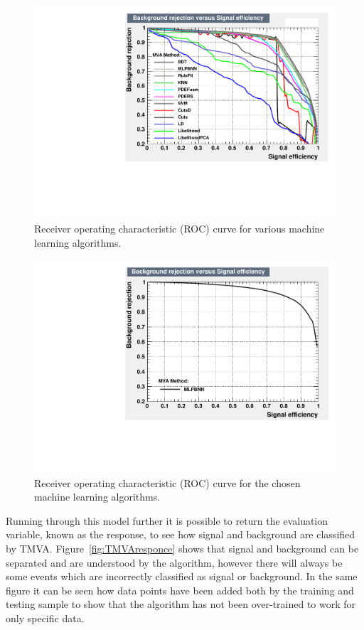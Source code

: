 \begin{figure}[h!]
\centering

\includegraphics[width=\textwidth]{figures/TMVA/roc12.pdf}
\caption{Receiver operating characteristic (ROC) curve for various machine learning algorithms.}
\label{fig:TMVAroc}
\end{figure}

\begin{figure}[h!]
\centering

\includegraphics[width=\textwidth]{figures/TMVA/ROC1.pdf}
\caption{Receiver operating characteristic (ROC) curve for the chosen machine learning algorithms.}
\label{fig:TMVAroc2}
\end{figure}

Running through this model further it is possible to return the evaluation variable, known as the response, to see how signal and background are classified by TMVA. Figure~\ref{fig:TMVAresponce} shows that signal and background can be separated and are understood by the algorithm, however there will always be some events which are incorrectly classified as signal or background. In the same figure it can be seen how data points have been added both by the training and testing sample to show that the algorithm has not been over-trained to work for only specific data.


